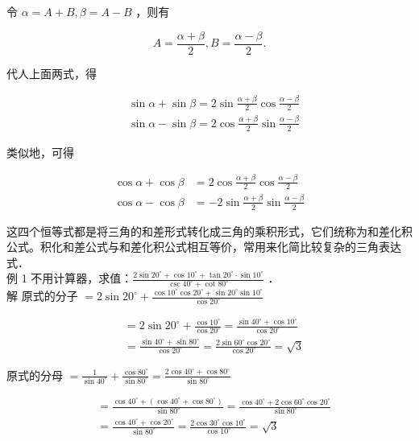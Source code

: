 \documentclass[10pt]{article}
\begin{document}
令 \(\alpha=A+B, \beta=A-B\) ，则有

\[
A=\frac{\alpha+\beta}{2}, B=\frac{\alpha-\beta}{2} .
\]

代人上面两式，得

\[
\begin{aligned}
& \sin \alpha+\sin \beta=2 \sin \frac{\alpha+\beta}{2} \cos \frac{\alpha-\beta}{2} \\
& \sin \alpha-\sin \beta=2 \cos \frac{\alpha+\beta}{2} \sin \frac{\alpha-\beta}{2}
\end{aligned}
\]

类似地，可得

\[
\begin{aligned}
\cos \alpha+\cos \beta & =2 \cos \frac{\alpha+\beta}{2} \cos \frac{\alpha-\beta}{2} \\
\cos \alpha-\cos \beta & =-2 \sin \frac{\alpha+\beta}{2} \sin \frac{\alpha-\beta}{2}
\end{aligned}
\]

这四个恒等式都是将三角的和差形式转化成三角的乘积形式，它们统称为和差化积公式。积化和差公式与和差化积公式相互等价，常用来化简比较复杂的三角表达式．\\
例 1 不用计算器，求值：\(\frac{2 \sin 20^{\circ}+\cos 10^{\circ}+\tan 20^{\circ} \cdot \sin 10^{\circ}}{\csc 40^{\circ}+\cot 80^{\circ}}\) ．\\
解 原式的分子 \(=2 \sin 20^{\circ}+\frac{\cos 10^{\circ} \cos 20^{\circ}+\sin 20^{\circ} \sin 10^{\circ}}{\cos 20^{\circ}}\)

\[
\begin{aligned}
& =2 \sin 20^{\circ}+\frac{\cos 10^{\circ}}{\cos 20^{\circ}}=\frac{\sin 40^{\circ}+\cos 10^{\circ}}{\cos 20^{\circ}} \\
& =\frac{\sin 40^{\circ}+\sin 80^{\circ}}{\cos 20^{\circ}}=\frac{2 \sin 60^{\circ} \cos 20^{\circ}}{\cos 20^{\circ}}=\sqrt{3}
\end{aligned}
\]

原式的分母 \(=\frac{1}{\sin 40^{\circ}}+\frac{\cos 80^{\circ}}{\sin 80^{\circ}}=\frac{2 \cos 40^{\circ}+\cos 80^{\circ}}{\sin 80^{\circ}}\)

\[
\begin{aligned}
& =\frac{\cos 40^{\circ}+\left(\cos 40^{\circ}+\cos 80^{\circ}\right)}{\sin 80^{\circ}}=\frac{\cos 40^{\circ}+2 \cos 60^{\circ} \cos 20^{\circ}}{\sin 80^{\circ}} \\
& =\frac{\cos 40^{\circ}+\cos 20^{\circ}}{\sin 80^{\circ}}=\frac{2 \cos 30^{\circ} \cos 10^{\circ}}{\cos 10^{\circ}}=\sqrt{3}
\end{aligned}
\]
\end{document}
